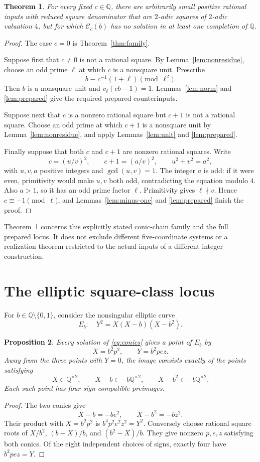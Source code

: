 \documentclass[10pt,a4paper]{article}
\newtheorem{theorem}{Theorem}[section]
\newtheorem{proposition}[theorem]{Proposition}
\newcommand{\Q}{\mathbb Q}
\begin{document}
\begin{theorem}\label{thm:all-c}
For every fixed $c\in\Q$, there are arbitrarily small positive
rational inputs with reduced square denominator that are $2$-adic
squares of $2$-adic valuation $4$, but for which $\mathcal C_c(b)$
has no solution in at least one completion of $\Q$.
\end{theorem}
\begin{proof}
The case $c=0$ is Theorem~\ref{thm:family}.

Suppose first that $c\ne0$ is not a rational square.
By Lemma~\ref{lem:nonresidue}, choose an odd prime $\ell$ at which
$c$ is a nonsquare unit. Prescribe
\[
                   b\equiv c^{-1}(1+\ell)\pmod{\ell^2}.
\]
Then $b$ is a nonsquare unit and $v_\ell(cb-1)=1$.
Lemmas~\ref{lem:norm} and \ref{lem:prepared} give the required
prepared counterinputs.

Suppose next that $c$ is a nonzero rational square but $c+1$ is
not a rational square. Choose an odd prime at which $c+1$ is a
nonsquare unit by Lemma~\ref{lem:nonresidue}, and apply
Lemmas~\ref{lem:unit} and \ref{lem:prepared}.

Finally suppose that both $c$ and $c+1$ are nonzero rational
squares. Write
\[
             c=(u/v)^2,\qquad c+1=(a/v)^2,
             \qquad u^2+v^2=a^2,
\]
with $u,v,a$ positive integers and $\gcd(u,v)=1$.
The integer $a$ is odd: if it were even, primitivity would make
$u,v$ both odd, contradicting the equation modulo $4$.
Also $a>1$, so it has an odd prime factor $\ell$.
Primitivity gives $\ell\nmid v$. Hence $c\equiv-1\pmod\ell$,
and Lemmas~\ref{lem:minus-one} and \ref{lem:prepared} finish
the proof.
\end{proof}

Theorem~\ref{thm:all-c} concerns this explicitly stated conic-chain
family and the full prepared locus. It does not exclude different
five-coordinate systems or a realization theorem restricted to the
actual inputs of a different integer construction.

\section{The elliptic square-class locus}
For $b\in\Q\setminus\{0,1\}$, consider the nonsingular elliptic
curve
\[
             E_b:\quad Y^2=X(X-b)(X-b^2).
\]
\begin{proposition}\label{prop:cover}
Every solution of \eqref{eq:conics} gives a point of $E_b$ by
\[
                 X=b^2p^2,\qquad Y=b^2pez.
\]
Away from the three points with $Y=0$, the image consists exactly
of the points satisfying
\[
 X\in\Q^{\times2},\qquad
 X-b\in-b\Q^{\times2},\qquad
 X-b^2\in-b\Q^{\times2}.
\]
Each such point has four sign-compatible preimages.
\end{proposition}
\begin{proof}
The two conics give
\[
 X-b=-be^2,\qquad X-b^2=-bz^2.
\]
Their product with $X=b^2p^2$ is $b^4p^2e^2z^2=Y^2$.
Conversely choose rational square roots of
$X/b^2$, $(b-X)/b$, and $(b^2-X)/b$. They give nonzero
$p,e,z$ satisfying both conics. Of the eight independent choices
of signs, exactly four have $b^2pez=Y$.
\end{proof}
\end{document}
